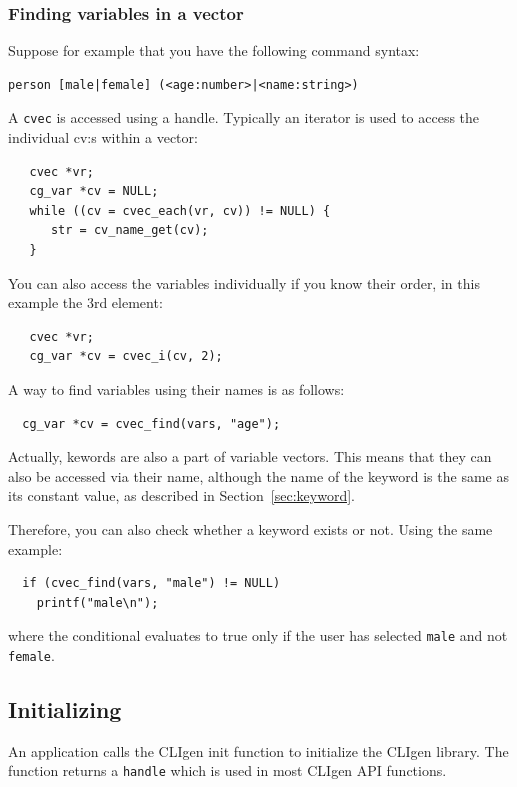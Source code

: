 \documentclass[a4paper, 10pt] {article}
\begin{document}
\subsubsection{Finding variables in a vector}
\label{sec:find}



Suppose for example that you have the following command syntax:
\begin{verbatim}
person [male|female] (<age:number>|<name:string>)
\end{verbatim}

A {\tt cvec} is accessed using a handle. Typically an iterator is used to access the individual cv:s within a vector:
\begin{verbatim}
   cvec *vr;
   cg_var *cv = NULL;
   while ((cv = cvec_each(vr, cv)) != NULL) {
      str = cv_name_get(cv);
   }
\end{verbatim}

You can also access the variables individually if you know their order, in this example the 3rd element:
\begin{verbatim}
   cvec *vr;
   cg_var *cv = cvec_i(cv, 2);
\end{verbatim}

A way to find variables using their names is as follows:
\begin{verbatim}
  cg_var *cv = cvec_find(vars, "age");
\end{verbatim}

Actually, kewords are also a part of variable vectors. This means that
they can also be accessed via their name, although the name of the
keyword is the same as its constant value, as described in
Section~\ref{sec:keyword}.

Therefore, you can also check whether a keyword exists or not. Using the same example:
\begin{verbatim}
  if (cvec_find(vars, "male") != NULL)
    printf("male\n");
\end{verbatim}
where the conditional evaluates to true only if the user has selected
{\tt male} and not {\tt female}.

\subsection{Initializing}
\label{sec:handle}

An application calls the CLIgen init function to initialize the CLIgen
library.  The function returns a {\tt handle} which is used in most
CLIgen API functions.
\end{document}
